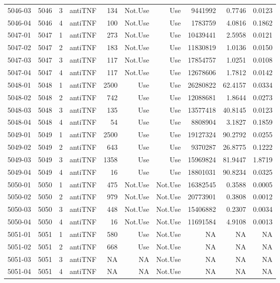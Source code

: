 {\begin{longtable}{ | r | r | r | r | r | r | r | r | r | r | }
5046-03 & 5046 & 3 & antiTNF & 134 & Not.Use & Use & 9441992 & 0.7746 & 0.0123\\ 
5046-04 & 5046 & 4 & antiTNF & 100 & Not.Use & Use & 1783759 & 4.0816 & 0.1862\\ 
5047-01 & 5047 & 1 & antiTNF & 273 & Not.Use & Use & 10439441 & 2.5958 & 0.0121\\ 
5047-02 & 5047 & 2 & antiTNF & 183 & Not.Use & Use & 11830819 & 1.0136 & 0.0150\\ 
5047-03 & 5047 & 3 & antiTNF & 117 & Not.Use & Use & 17854757 & 1.0251 & 0.0108\\ 
5047-04 & 5047 & 4 & antiTNF & 117 & Not.Use & Use & 12678606 & 1.7812 & 0.0142\\ 
5048-01 & 5048 & 1 & antiTNF & 2500 & Use & Use & 26280822 & 62.4157 & 0.0334\\ 
5048-02 & 5048 & 2 & antiTNF & 742 & Use & Use & 12088681 & 1.8644 & 0.0273\\ 
5048-03 & 5048 & 3 & antiTNF & 135 & Use & Use & 13577418 & 40.8145 & 0.0123\\ 
5048-04 & 5048 & 4 & antiTNF & 54 & Use & Use & 8808904 & 3.1827 & 0.1859\\ 
5049-01 & 5049 & 1 & antiTNF & 2500 & Use & Use & 19127324 & 90.2792 & 0.0255\\ 
5049-02 & 5049 & 2 & antiTNF & 643 & Use & Use & 9370287 & 26.8775 & 0.1222\\ 
5049-03 & 5049 & 3 & antiTNF & 1358 & Use & Use & 15969824 & 81.9447 & 1.8719\\ 
5049-04 & 5049 & 4 & antiTNF & 16 & Use & Use & 18801031 & 90.8234 & 0.0325\\ 
5050-01 & 5050 & 1 & antiTNF & 475 & Not.Use & Not.Use & 16382545 & 0.3588 & 0.0005\\ 
5050-02 & 5050 & 2 & antiTNF & 979 & Not.Use & Not.Use & 20773901 & 0.3808 & 0.0012\\ 
5050-03 & 5050 & 3 & antiTNF & 448 & Not.Use & Not.Use & 15406882 & 0.2307 & 0.0034\\ 
5050-04 & 5050 & 4 & antiTNF & 16 & Not.Use & Not.Use & 11691584 & 4.9108 & 0.0013\\ 
5051-01 & 5051 & 1 & antiTNF & 580 & Use & Not.Use & NA & NA & NA\\ 
5051-02 & 5051 & 2 & antiTNF & 668 & Use & Not.Use & NA & NA & NA\\ 
5051-03 & 5051 & 3 & antiTNF & NA & NA & Not.Use & NA & NA & NA\\ 
5051-04 & 5051 & 4 & antiTNF & NA & NA & Not.Use & NA & NA & NA\\ 

\end{longtable}}
